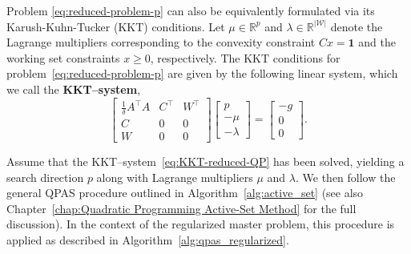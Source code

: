 \documentclass{book}
\theoremstyle{definition}
\numberwithin{algorithm_}{chapter}
\begin{document}
{Problem \eqref{eq:reduced-problem-p} can also be equivalently formulated via its Karush-Kuhn-Tucker (KKT) conditions.  
Let \(\mu \in \mathbb{R}^p\) and \(\lambda \in \mathbb{R}^{|\mathcal{W}|}\) denote the Lagrange multipliers corresponding to the convexity constraint \(C x = \mathbf{1}\) and the working set constraints \(x \geq 0\), respectively.  
The KKT conditions for problem~\eqref{eq:reduced-problem-p} are given by the following linear system, which we call the \textbf{KKT--system},
\begin{equation} \label{eq:KKT-reduced-QP}
\begin{bmatrix}
\frac{1}{\delta} A^\top A & C^\top & W^\top \\
C & 0 & 0 \\
W & 0 & 0
\end{bmatrix}
\begin{bmatrix}
p \\ -\mu \\ -\lambda
\end{bmatrix}
=
\begin{bmatrix}
- g \\ 0 \\ 0
\end{bmatrix}.
\end{equation}

Assume that the KKT--system~\eqref{eq:KKT-reduced-QP} has been solved, yielding a search direction \(p\) along with Lagrange multipliers \(\mu\) and \(\lambda\).  
We then follow the general QPAS procedure outlined in Algorithm~\ref{alg:active_set} (see also Chapter~\ref{chap:Quadratic Programming Active-Set Method} for the full discussion). In the context of the regularized master problem, this procedure is applied as described in Algorithm~\ref{alg:qpas_regularized}.

\bigskip

}
\end{document}
